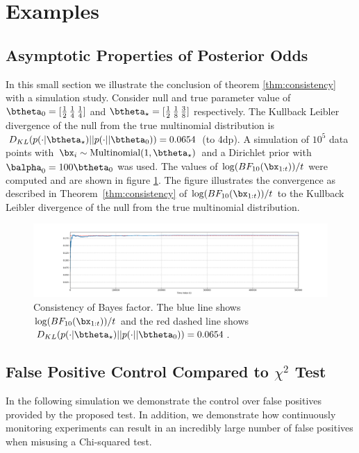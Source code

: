 \documentclass[11pt]{article}
\def\log{{\rm log}}
\begin{document}
\section{Examples}
\label{sec:simulation}
\subsection{Asymptotic Properties of Posterior Odds}
In this small section we illustrate the conclusion of theorem \ref{thm:consistency} with a simulation study.
Consider null and true parameter value of $\btheta_0=[\frac{1}{2}\, \frac{1}{4}\, \frac{1}{4}]$ and $\btheta_\star=[\frac{1}{2}\, \frac{1}{8}\, \frac{3}{8}]$ respectively.
The Kullback Leibler divergence of the null from the true multinomial distribution is $D_{KL}(p(\cdot|\btheta_\star)||p(\cdot||\btheta_0)) = 0.0654$ (to 4dp).
A simulation of $10^5$ data points with $\bx_i \sim \text{Multinomial}(1, \btheta_\star)$ and a Dirichlet prior with $\balpha_0 = 100\btheta_0$ was used.
The values of $\log(BF_{10}(\bx_{1:t}))/t$ were computed and are shown in figure \ref{fig:lbf}.
The figure illustrates the convergence as described in Theorem~\ref{thm:consistency} of $\log(BF_{10}(\bx_{1:t}))/t$ to the Kullback Leibler divergence of the null from the true multinomial distribution.
\begin{figure}[H]
  \centering
  \includegraphics[scale=0.35]{images/consistency.png}
  \caption{Consistency of Bayes factor.
The blue line shows $\log(BF_{10}(\bx_{1:t}))/t$ and the red dashed line shows $D_{KL}(p(\cdot|\btheta_\star)||p(\cdot||\btheta_0)) = 0.0654$.}
    \label{fig:lbf}
  \end{figure}
  \subsection{False Positive Control Compared to $\chi^2$ Test}
  In the following simulation we demonstrate the control over false positives provided by the proposed test.
  In addition, we demonstrate how continuously monitoring experiments can result in an incredibly large number of false positives when misusing a Chi-squared test.
\end{document}
